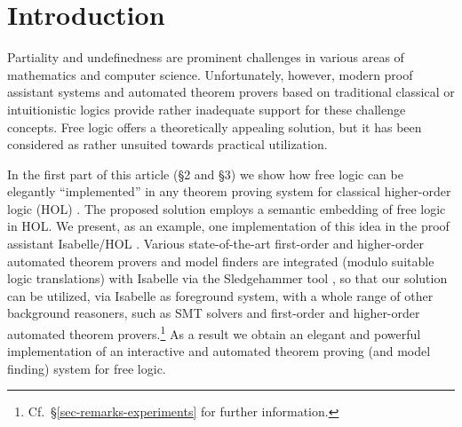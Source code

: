 \section{Introduction}
\label{intro}
Partiality and undefinedness are prominent challenges in various areas
of mathematics and computer science.  Unfortunately, however, modern
proof assistant systems and automated theorem provers based on
traditional classical or intuitionistic logics provide rather
inadequate support for these challenge concepts.  Free logic \cite{Lambert60,Scott67,lambert02:_free_logic,sep-logic-free} offers a
theoretically appealing solution, but it has been considered as rather
unsuited towards practical utilization.


In the first part of this article (\S2 and \S3) we show how free logic
can be elegantly ``implemented'' in any theorem proving system for
classical higher-order logic (HOL) \cite{B5}. The proposed solution
employs a semantic embedding of free logic in HOL. We present, as an
example, one implementation of this idea in the proof
assistant Isabelle/HOL \cite{NPW02}. Various state-of-the-art
first-order and higher-order automated theorem provers and model
finders are integrated (modulo suitable logic translations) with
Isabelle via the Sledgehammer tool \cite{Sledgehammer}, so that our
solution can be utilized, via Isabelle as foreground system, with a
whole range of other background reasoners, such as SMT solvers and
first-order and higher-order automated theorem
provers.\footnote{Cf.~\S\ref{sec-remarks-experiments} for further
  information.} As a result we obtain an
elegant and powerful implementation of an interactive and automated
theorem proving (and model finding) system for free logic.





